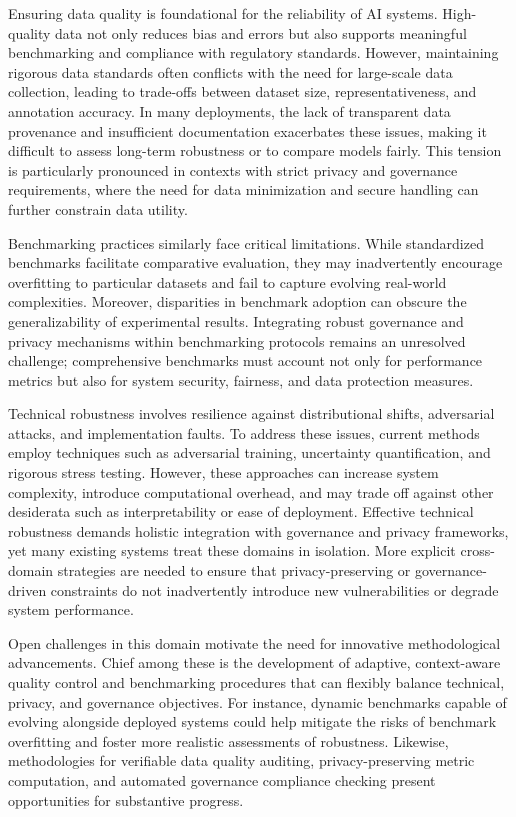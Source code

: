 \documentclass[sigconf]{acmart}
\begin{document}
Ensuring data quality is foundational for the reliability of AI systems. High-quality data not only reduces bias and errors but also supports meaningful benchmarking and compliance with regulatory standards. However, maintaining rigorous data standards often conflicts with the need for large-scale data collection, leading to trade-offs between dataset size, representativeness, and annotation accuracy. In many deployments, the lack of transparent data provenance and insufficient documentation exacerbates these issues, making it difficult to assess long-term robustness or to compare models fairly. This tension is particularly pronounced in contexts with strict privacy and governance requirements, where the need for data minimization and secure handling can further constrain data utility.

Benchmarking practices similarly face critical limitations. While standardized benchmarks facilitate comparative evaluation, they may inadvertently encourage overfitting to particular datasets and fail to capture evolving real-world complexities. Moreover, disparities in benchmark adoption can obscure the generalizability of experimental results. Integrating robust governance and privacy mechanisms within benchmarking protocols remains an unresolved challenge; comprehensive benchmarks must account not only for performance metrics but also for system security, fairness, and data protection measures.

Technical robustness involves resilience against distributional shifts, adversarial attacks, and implementation faults. To address these issues, current methods employ techniques such as adversarial training, uncertainty quantification, and rigorous stress testing. However, these approaches can increase system complexity, introduce computational overhead, and may trade off against other desiderata such as interpretability or ease of deployment. Effective technical robustness demands holistic integration with governance and privacy frameworks, yet many existing systems treat these domains in isolation. More explicit cross-domain strategies are needed to ensure that privacy-preserving or governance-driven constraints do not inadvertently introduce new vulnerabilities or degrade system performance.

Open challenges in this domain motivate the need for innovative methodological advancements. Chief among these is the development of adaptive, context-aware quality control and benchmarking procedures that can flexibly balance technical, privacy, and governance objectives. For instance, dynamic benchmarks capable of evolving alongside deployed systems could help mitigate the risks of benchmark overfitting and foster more realistic assessments of robustness. Likewise, methodologies for verifiable data quality auditing, privacy-preserving metric computation, and automated governance compliance checking present opportunities for substantive progress.
\end{document}
